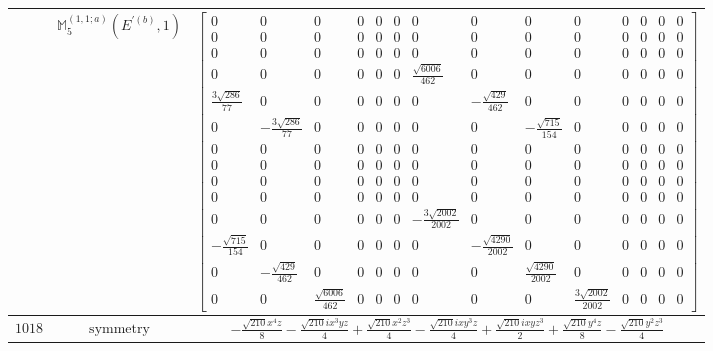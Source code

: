\documentclass[fleqn,8pt,landscape]{jsarticle}
\begin{document}
\begin{longtable}{ccc}
$  $ & $ \mathbb{M}_{5}^{(1,1;a)}(E^{\prime(b)},1) $ & $ \begin{bmatrix} 0 & 0 & 0 & 0 & 0 & 0 & 0 & 0 & 0 & 0 & 0 & 0 & 0 & 0 \\ 0 & 0 & 0 & 0 & 0 & 0 & 0 & 0 & 0 & 0 & 0 & 0 & 0 & 0 \\ 0 & 0 & 0 & 0 & 0 & 0 & 0 & 0 & 0 & 0 & 0 & 0 & 0 & 0 \\ 0 & 0 & 0 & 0 & 0 & 0 & \frac{\sqrt{6006}}{462} & 0 & 0 & 0 & 0 & 0 & 0 & 0 \\ \frac{3 \sqrt{286}}{77} & 0 & 0 & 0 & 0 & 0 & 0 & - \frac{\sqrt{429}}{462} & 0 & 0 & 0 & 0 & 0 & 0 \\ 0 & - \frac{3 \sqrt{286}}{77} & 0 & 0 & 0 & 0 & 0 & 0 & - \frac{\sqrt{715}}{154} & 0 & 0 & 0 & 0 & 0 \\ 0 & 0 & 0 & 0 & 0 & 0 & 0 & 0 & 0 & 0 & 0 & 0 & 0 & 0 \\ 0 & 0 & 0 & 0 & 0 & 0 & 0 & 0 & 0 & 0 & 0 & 0 & 0 & 0 \\ 0 & 0 & 0 & 0 & 0 & 0 & 0 & 0 & 0 & 0 & 0 & 0 & 0 & 0 \\ 0 & 0 & 0 & 0 & 0 & 0 & 0 & 0 & 0 & 0 & 0 & 0 & 0 & 0 \\ 0 & 0 & 0 & 0 & 0 & 0 & - \frac{3 \sqrt{2002}}{2002} & 0 & 0 & 0 & 0 & 0 & 0 & 0 \\ - \frac{\sqrt{715}}{154} & 0 & 0 & 0 & 0 & 0 & 0 & - \frac{\sqrt{4290}}{2002} & 0 & 0 & 0 & 0 & 0 & 0 \\ 0 & - \frac{\sqrt{429}}{462} & 0 & 0 & 0 & 0 & 0 & 0 & \frac{\sqrt{4290}}{2002} & 0 & 0 & 0 & 0 & 0 \\ 0 & 0 & \frac{\sqrt{6006}}{462} & 0 & 0 & 0 & 0 & 0 & 0 & \frac{3 \sqrt{2002}}{2002} & 0 & 0 & 0 & 0 \end{bmatrix} $ \\ \hline
$ 1018 $ & $ \text{symmetry} $ & $ - \frac{\sqrt{210} x^{4} z}{8} - \frac{\sqrt{210} i x^{3} y z}{4} + \frac{\sqrt{210} x^{2} z^{3}}{4} - \frac{\sqrt{210} i x y^{3} z}{4} + \frac{\sqrt{210} i x y z^{3}}{2} + \frac{\sqrt{210} y^{4} z}{8} - \frac{\sqrt{210} y^{2} z^{3}}{4} $ \\

\end{longtable}
\end{document}
